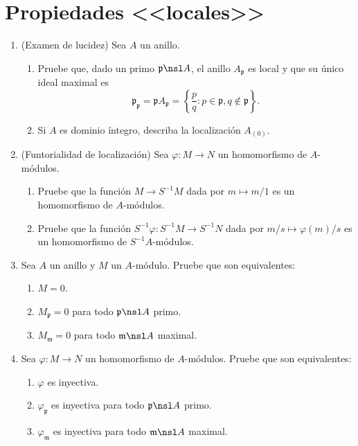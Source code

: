 \documentclass[11pt, reqno]{amsart}
\begin{document}
\section{Propiedades <<locales>>}
\begin{enumerate}
	\item\lookright
		(Examen de lucidez)
		Sea $A$ un anillo.
		\begin{enumerate}
			\item Pruebe que, dado un primo $\mathfrak{p} \nsl A$, el anillo $A_{\mathfrak{p}}$ es local y
				que su único ideal maximal es
				\[
					\mathfrak{p_p} = \mathfrak{p}A_{\mathfrak{p}} =
					\left\{ \frac{p}{q} : p \in \mathfrak{p}, q \notin \mathfrak{p} \right\}.
				\]
			\item Si $A$ es dominio íntegro, describa la localización $A_{(0)}$.
		\end{enumerate}

	\item (Funtorialidad de localización)
		Sea $\varphi \colon M \to N$ un homomorfismo de $A$-módulos.
		\begin{enumerate}
			\item Pruebe que la función $M \to S^{-1}M$ dada por $m \mapsto m/1$ es un homomorfismo de
				$A$-módulos.
			\item Pruebe que la función $S^{-1}\varphi \colon S^{-1}M \to S^{-1}N$ dada por $m/s \mapsto
				\varphi(m)/s$ es un homomorfismo de $S^{-1}A$-módulos.
		\end{enumerate}

	\item Sea $A$ un anillo y $M$ un $A$-módulo.
		Pruebe que son equivalentes:
		\begin{enumerate}
			\item $M = 0$.
			\item $M_{\mathfrak{p}} = 0$ para todo $\mathfrak{p} \nsl A$ primo.
			\item $M_{\mathfrak{m}} = 0$ para todo $\mathfrak{m} \nsl A$ maximal.
		\end{enumerate}

	\item\label{localizing_module_morph}
		Sea $\varphi \colon M \to N$ un homomorfismo de $A$-módulos.
		Pruebe que son equivalentes:
		\begin{enumerate}
			\item $\varphi$ es inyectiva.
			\item $\varphi_{\mathfrak{p}}$ es inyectiva para todo $\mathfrak{p} \nsl A$ primo.
			\item $\varphi_{\mathfrak{m}}$ es inyectiva para todo $\mathfrak{m} \nsl A$ maximal.
		\end{enumerate}


\end{enumerate}
\end{document}
